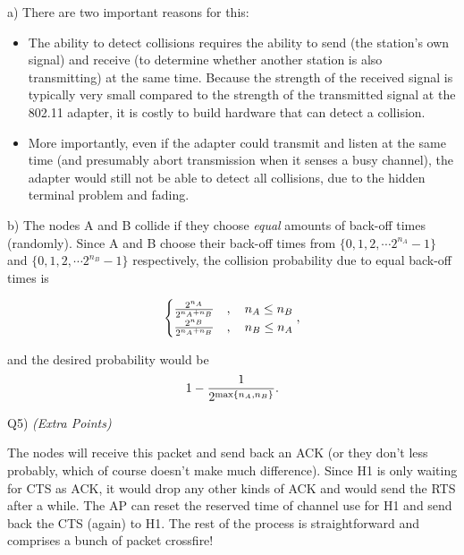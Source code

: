 \documentclass[10pt,letterpaper]{article}
\newcommand{\qn}[1]{
\begin{equation}
\begin{split}
#1
\end{split}
\end{equation}
}
\begin{document}
a) There are two important reasons for this:
\begin{itemize}
\item
The ability to detect collisions requires the ability to send (the station’s own signal) and receive (to determine whether another station is also transmitting) at the same time. Because the strength of the received signal is typically very small compared to the strength of the transmitted signal at the 802.11 adapter, it is costly to build hardware that can detect a collision.
\item
More importantly, even if the adapter could transmit and listen at the same time (and presumably abort transmission when it senses a busy channel), the adapter would still not be able to detect all collisions, due to the hidden terminal problem and fading.
\end{itemize}

b) The nodes A and B collide if they choose \textit{equal} amounts of back-off times (randomly). Since A and B choose their back-off times from $\{0,1,2,\cdots 2^{n_A}-1\}$ and $\{0,1,2,\cdots 2^{n_B}-1\}$ respectively, the collision probability due to equal back-off times is
\qn{
\begin{cases}
{2^{n_A}\over2^{n_A+n_B}}&,\quad n_A\le n_B\\
{2^{n_B}\over2^{n_A+n_B}}&,\quad n_B\le n_A
\end{cases},
}
and the desired probability would be
$$
1-{1\over 2^{\max\{n_A,n_B\}}}
.
$$

Q5) \textit{(Extra Points)}

The nodes will receive this packet and send back an ACK (or they don't less probably, which of course doesn't make much difference). Since H1 is only waiting for CTS as ACK, it would drop any other kinds of ACK and would send the RTS after a while. The AP can reset the reserved time of channel use for H1 and send back the CTS (again) to H1. The rest of the process is straightforward and comprises a bunch of packet crossfire!
\end{document}
